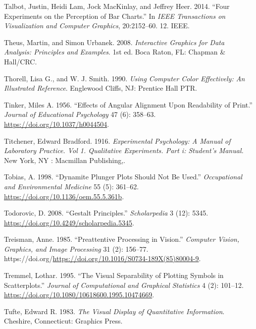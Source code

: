 \documentclass[
  letterpaper,
  DIV=11,
  numbers=noendperiod]{scrreprt}
\newlength{\cslhangindent}
\newenvironment{CSLReferences}[2] %
 {\begin{list}{}{%
  \setlength{\itemindent}{0pt}
  \setlength{\leftmargin}{0pt}
  \setlength{\parsep}{0pt}
  \ifodd #1
   \setlength{\leftmargin}{\cslhangindent}
   \setlength{\itemindent}{-1\cslhangindent}
  \fi
  \setlength{\itemsep}{#2\baselineskip}}}
 {\end{list}}
\begin{document}
\begin{CSLReferences}{1}{0}
Talbot, Justin, Heidi Lam, Jock MacKinlay, and Jeffrey Heer. 2014.
{``Four Experiments on the Perception of Bar Charts.''} In \emph{IEEE
Transactions on Visualization and Computer Graphics}, 20:2152--60. 12.
IEEE.

Theus, Martin, and Simon Urbanek. 2008. \emph{Interactive Graphics for
Data Analysis: Principles and Examples}. 1st ed. Boca Raton, FL: Chapman
\& Hall/CRC.

Thorell, Lisa G., and W. J. Smith. 1990. \emph{Using Computer Color
Effectively: An Illustrated Reference}. Englewood Cliffs, NJ: Prentice
Hall PTR.

Tinker, Miles A. 1956. {``Effects of Angular Alignment Upon Readability
of Print.''} \emph{Journal of Educational Psychology} 47 (6): 358--63.
\url{https://doi.org/10.1037/h0044504}.

Titchener, Edward Bradford. 1916. \emph{Experimental Psychology: A
Manual of Laboratory Practice. Vol 1. Qualitative Experiments. Part i:
Student's Manual.} New York, NY : Macmillan Publishing,.

Tobias, A. 1998. {``Dynamite Plunger Plots Should Not Be Used.''}
\emph{Occupational and Environmental Medicine} 55 (5): 361--62.
\url{https://doi.org/10.1136/oem.55.5.361b}.

Todorovic, D. 2008. {``{G}estalt Principles.''} \emph{Scholarpedia} 3
(12): 5345. \url{https://doi.org/10.4249/scholarpedia.5345}.

Treisman, Anne. 1985. {``Preattentive Processing in Vision.''}
\emph{Computer Vision, Graphics, and Image Processing} 31 (2): 156--77.
https://doi.org/\url{https://doi.org/10.1016/S0734-189X(85)80004-9}.

Tremmel, Lothar. 1995. {``The Visual Separability of Plotting Symbols in
Scatterplots.''} \emph{Journal of Computational and Graphical
Statistics} 4 (2): 101--12.
\url{https://doi.org/10.1080/10618600.1995.10474669}.

Tufte, Edward R. 1983. \emph{The Visual Display of Quantitative
Information}. Cheshire, Connecticut: Graphics Press.


\end{CSLReferences}
\end{document}
